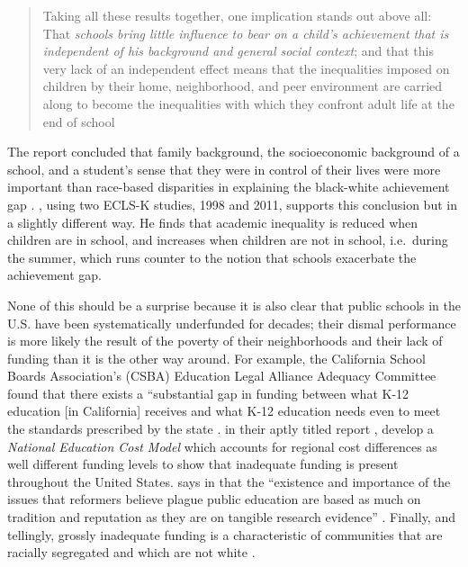 \blockquote[{\parencite[325]{Coleman1966}}][]{\OnehalfSpacing%
  Taking all these results together, one implication stands out above all: That \textit{schools bring little influence to bear on a child's achievement that is independent of his background and general social context}; and that this very lack of an independent effect means that the inequalities imposed on children by their home, neighborhood, and peer environment are carried along to become the inequalities with which they confront adult life at the end of school}.
The report concluded that family background, the socioeconomic background of a school, and a student's sense that they were in control of their lives were more important than race-based disparities in explaining the black-white achievement gap \parencite{Pearce2016}. \textcite{Downey2020}, using two ECLS-K studies, 1998 and 2011, supports this conclusion but in a slightly different way. He finds that academic inequality is reduced when children are in school, and increases when children are not in school, i.e.~during the summer, which runs counter to the notion that schools exacerbate the achievement gap.

None of this should be a surprise because it is also clear that public schools in the U.S. have been systematically underfunded for decades; their dismal performance is more likely the result of the poverty of their neighborhoods and their lack of funding than it is the other way around. For example, the California School Boards Association's (CSBA) Education Legal Alliance Adequacy Committee found that there exists a ``substantial gap in funding between what K-12 education [in California] receives and what K-12 education needs even to meet the standards prescribed by the state \parencite[\textit{iii}]{Bray2015}. \textcite{Baker.etal2018} in their aptly titled report , develop a \textit{National Education Cost Model} \parencite%
{Baker.etal2018} which accounts for regional cost differences as well different funding levels to show that inadequate funding is present throughout the United States. \textcite{Garcia2018} says in  that the ``existence and importance of the issues that reformers believe plague public education are based as much on tradition and reputation as they are on tangible research evidence'' \parencite[54]{Garcia2018}. Finally, and tellingly, grossly inadequate funding is a characteristic of communities that are racially segregated and which are not white \parencite{Darling-Hammond2012, Rothstein2017}.

